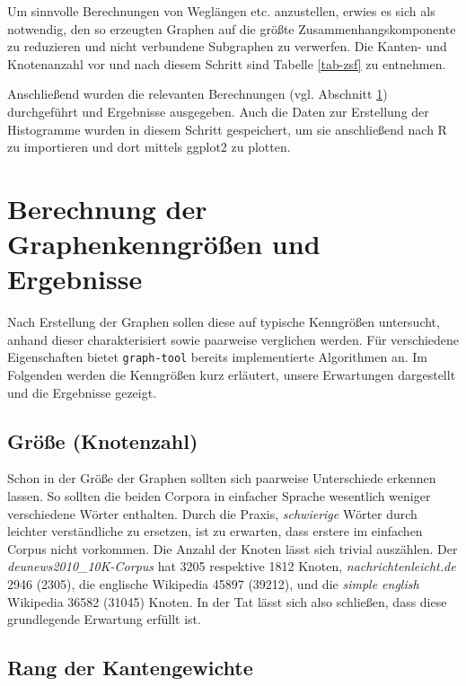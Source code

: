 \documentclass[11pt, a4paper]{article}
\begin{document}
Um sinnvolle Berechnungen von Weglängen etc. anzustellen, erwies es sich als
notwendig, den so erzeugten Graphen auf die größte Zusammenhangskomponente zu
reduzieren und nicht verbundene Subgraphen zu verwerfen.
Die Kanten- und Knotenanzahl vor und nach diesem Schritt sind Tabelle
\ref{tab-zsf} zu entnehmen.

Anschließend wurden die relevanten Berechnungen (vgl. Abschnitt
\ref{berechnung-ergebnisse}) durchgeführt und Ergebnisse ausgegeben.
Auch die Daten zur Erstellung der Histogramme wurden in diesem Schritt gespeichert,
um sie anschließend nach R zu importieren und dort mittels ggplot2 zu plotten.


\section{Berechnung der Graphenkenngr\"o\ss{}en und Ergebnisse}
\label{berechnung-ergebnisse}

Nach Erstellung der Graphen sollen diese auf typische Kenngrößen untersucht,
anhand dieser charakterisiert sowie paarweise verglichen werden. Für
verschiedene Eigenschaften bietet \texttt{graph-tool} bereits implementierte
Algorithmen an. Im Folgenden werden die Kenngrößen kurz erläutert, unsere
Erwartungen dargestellt und die Ergebnisse gezeigt.

\subsection{Gr\"o\ss{}e (Knotenzahl)}

Schon in der Größe der Graphen sollten sich paarweise Unterschiede erkennen
lassen. So sollten die beiden Corpora in einfacher Sprache wesentlich weniger
verschiedene Wörter enthalten. Durch die Praxis, \emph{schwierige} Wörter
durch leichter verständliche zu ersetzen, ist zu erwarten, dass erstere im einfachen
Corpus nicht vorkommen. Die Anzahl der Knoten lässt sich trivial auszählen.
Der \emph{deunews2010\_10K-Corpus} hat 3205 respektive 1812
Knoten, \emph{nachrichtenleicht.de} 2946 (2305), die englische Wikipedia 45897
(39212), und die \emph{simple english} Wikipedia 36582 (31045) Knoten. In der
Tat l\"asst sich also schlie\ss{}en, dass diese grundlegende Erwartung
erf\"ullt ist.

\subsection{Rang der Kantengewichte}
\end{document}
